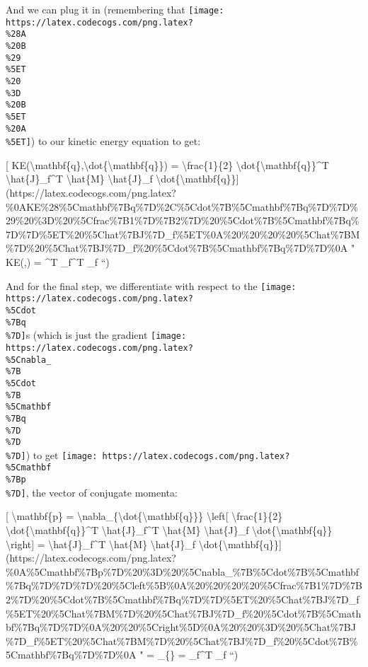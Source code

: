 \documentclass[]{article}
\begin{document}
And we can plug it in (remembering that
\texttt{[image: https://latex.codecogs.com/png.latex?\\\%28A\\\%20B\\\%29\\\%5ET\\\%20\\\%3D\\\%20B\\\%5ET\\\%20A\\\%5ET]})
to our kinetic energy equation to get:

{[}
KE(\textbackslash{}mathbf\{q\},\textbackslash{}dot\{\textbackslash{}mathbf\{q\}\})
= \textbackslash{}frac\{1\}\{2\}
\textbackslash{}dot\{\textbackslash{}mathbf\{q\}\}\^{}T
\textbackslash{}hat\{J\}\_f\^{}T \textbackslash{}hat\{M\}
\textbackslash{}hat\{J\}\_f
\textbackslash{}dot\{\textbackslash{}mathbf\{q\}\}{]}(https://latex.codecogs.com/png.latex?\%0AKE\%28\%5Cmathbf\%7Bq\%7D\%2C\%5Cdot\%7B\%5Cmathbf\%7Bq\%7D\%7D\%29\%20\%3D\%20\%5Cfrac\%7B1\%7D\%7B2\%7D\%20\%5Cdot\%7B\%5Cmathbf\%7Bq\%7D\%7D\%5ET\%20\%5Chat\%7BJ\%7D\_f\%5ET\%0A\%20\%20\%20\%20\%5Chat\%7BM\%7D\%20\%5Chat\%7BJ\%7D\_f\%20\%5Cdot\%7B\%5Cmathbf\%7Bq\%7D\%7D\%0A
" KE(,) =  \^{}T
\_f\^{}T  \_f  ``)

And for the final step, we differentiate with respect to the
\texttt{[image: https://latex.codecogs.com/png.latex?\\\%5Cdot\\\%7Bq\\\%7D]}s (which
is just the gradient
\texttt{[image: https://latex.codecogs.com/png.latex?\\\%5Cnabla\_\\\%7B\\\%5Cdot\\\%7B\\\%5Cmathbf\\\%7Bq\\\%7D\\\%7D\\\%7D]})
to get
\texttt{[image: https://latex.codecogs.com/png.latex?\\\%5Cmathbf\\\%7Bp\\\%7D]}, the
vector of conjugate momenta:

{[} \textbackslash{}mathbf\{p\} =
\textbackslash{}nabla\_\{\textbackslash{}dot\{\textbackslash{}mathbf\{q\}\}\}
\textbackslash{}left{[} \textbackslash{}frac\{1\}\{2\}
\textbackslash{}dot\{\textbackslash{}mathbf\{q\}\}\^{}T
\textbackslash{}hat\{J\}\_f\^{}T \textbackslash{}hat\{M\}
\textbackslash{}hat\{J\}\_f \textbackslash{}dot\{\textbackslash{}mathbf\{q\}\}
\textbackslash{}right{]} = \textbackslash{}hat\{J\}\_f\^{}T
\textbackslash{}hat\{M\} \textbackslash{}hat\{J\}\_f
\textbackslash{}dot\{\textbackslash{}mathbf\{q\}\}{]}(https://latex.codecogs.com/png.latex?\%0A\%5Cmathbf\%7Bp\%7D\%20\%3D\%20\%5Cnabla\_\%7B\%5Cdot\%7B\%5Cmathbf\%7Bq\%7D\%7D\%7D\%20\%5Cleft\%5B\%0A\%20\%20\%20\%20\%5Cfrac\%7B1\%7D\%7B2\%7D\%20\%5Cdot\%7B\%5Cmathbf\%7Bq\%7D\%7D\%5ET\%20\%5Chat\%7BJ\%7D\_f\%5ET\%20\%5Chat\%7BM\%7D\%20\%5Chat\%7BJ\%7D\_f\%20\%5Cdot\%7B\%5Cmathbf\%7Bq\%7D\%7D\%0A\%20\%20\%5Cright\%5D\%0A\%20\%20\%3D\%20\%5Chat\%7BJ\%7D\_f\%5ET\%20\%5Chat\%7BM\%7D\%20\%5Chat\%7BJ\%7D\_f\%20\%5Cdot\%7B\%5Cmathbf\%7Bq\%7D\%7D\%0A
"  = \nabla\_\{\} 
 = \_f\^{}T  \_f  ``)
\end{document}
